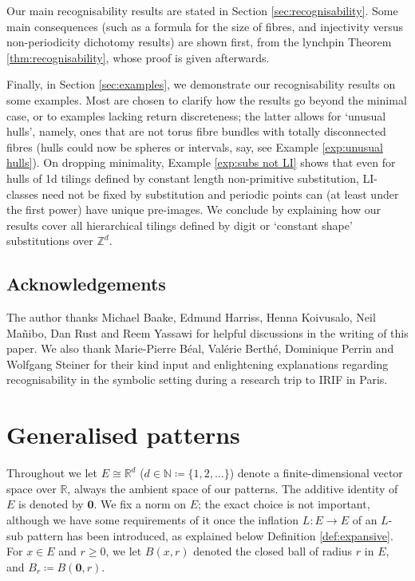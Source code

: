 \documentclass[11pt]{amsart}
\numberwithin{equation}{section}
\theoremstyle{plain}
\theoremstyle{definition}
\newcommand{\R}{\mathbb R}
\newcommand{\Z}{\mathbb Z}
\newcommand{\N}{\mathbb N}
\begin{document}
Our main recognisability results are stated in Section \ref{sec:recognisability}. Some main consequences (such as a formula for the size of fibres, and injectivity versus non-periodicity dichotomy results) are shown first, from the lynchpin Theorem \ref{thm:recognisability}, whose proof is given afterwards.

Finally, in Section \ref{sec:examples}, we demonstrate our recognisability results on some examples. Most are chosen to clarify how the results go beyond the minimal case, or to examples lacking return discreteness; the latter allows for `unusual hulls', namely, ones that are not torus fibre bundles with totally disconnected fibres \cite{SW03} (hulls could now be spheres or intervals, say, see Example \ref{exp:unusual hulls}). On dropping minimality, Example \ref{exp:subs not LI} shows that even for hulls of 1d tilings defined by constant length non-primitive substitution, LI-classes need not be fixed by substitution and periodic points can (at least under the first power) have unique pre-images. We conclude by explaining how our results cover all hierarchical tilings defined by digit or `constant shape' substitutions over \(\Z^d\).

\subsection*{Acknowledgements}
The author thanks Michael Baake, Edmund Harriss, Henna Koivusalo, Neil Ma\~{n}ibo, Dan Rust and Reem Yassawi for helpful discussions in the writing of this paper. We also thank Marie-Pierre B\'{e}al, Val\'{e}rie Berth\'{e}, Dominique Perrin and Wolfgang Steiner for their kind input and enlightening explanations regarding recognisability in the symbolic setting during a research trip to IRIF in Paris.

\section{Generalised patterns}
\label{sec:Generalised patterns}

Throughout we let \(E \cong \R^d\) (\(d \in \N \coloneqq \{1,2,\ldots\}\)) denote a finite-dimensional vector space over \(\R\), always the ambient space of our patterns. The additive identity of \(E\) is denoted by \(\mathbf{0}\). We fix a norm on \(E\); the exact choice is not important, although we have some requirements of it once the inflation \(L \colon E \to E\) of an \(L\)-sub pattern has been introduced, as explained below Definition \ref{def:expansive}. For \(x \in E\) and \(r \geq 0\), we let \(B(x,r)\) denoted the closed ball of radius \(r\) in \(E\), and \(B_r \coloneqq B(\mathbf{0},r)\).
\end{document}
